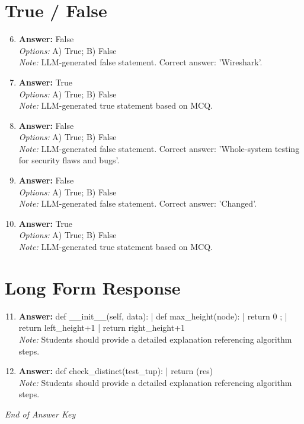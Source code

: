 \documentclass[12pt]{article}
\begin{document}
\section*{True / False}
\begin{enumerate}[label=\arabic*.]
\setcounter{enumi}{5}
\item \textbf{Answer:} False
\\ \textit{Options:} A) True; B) False
\\ \textit{Note:} LLM-generated false statement. Correct answer: 'Wireshark'.
\item \textbf{Answer:} True
\\ \textit{Options:} A) True; B) False
\\ \textit{Note:} LLM-generated true statement based on MCQ.
\item \textbf{Answer:} False
\\ \textit{Options:} A) True; B) False
\\ \textit{Note:} LLM-generated false statement. Correct answer: 'Whole-system testing for security flaws and bugs'.
\item \textbf{Answer:} False
\\ \textit{Options:} A) True; B) False
\\ \textit{Note:} LLM-generated false statement. Correct answer: 'Changed'.
\item \textbf{Answer:} True
\\ \textit{Options:} A) True; B) False
\\ \textit{Note:} LLM-generated true statement based on MCQ.
\end{enumerate}

\section*{Long Form Response}
\begin{enumerate}[label=\arabic*.]
\setcounter{enumi}{10}
\item \textbf{Answer:} def \_\_init\_\_(self, data): | def max\_height(node): | return 0 ; | return left\_height+1 | return right\_height+1
\\ \textit{Note:} Students should provide a detailed explanation referencing algorithm steps.
\item \textbf{Answer:} def check\_distinct(test\_tup): | return (res)
\\ \textit{Note:} Students should provide a detailed explanation referencing algorithm steps.
\end{enumerate}

\vfill
\noindent\textit{End of Answer Key}
\end{document}
